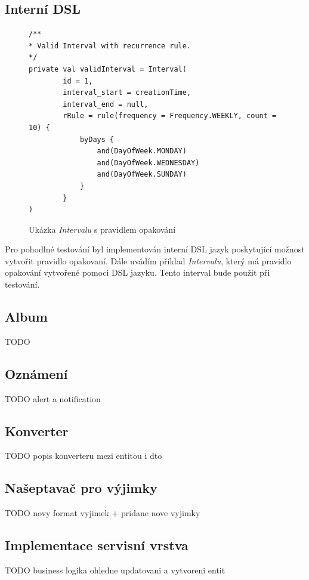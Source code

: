     \subsection{Interní DSL}
        \begin{figure} %
            \begin{verbatim}
/**
* Valid Interval with recurrence rule.
*/
private val validInterval = Interval(
        id = 1,
        interval_start = creationTime,
        interval_end = null,
        rRule = rule(frequency = Frequency.WEEKLY, count = 10) {
            byDays {
                and(DayOfWeek.MONDAY)
                and(DayOfWeek.WEDNESDAY)
                and(DayOfWeek.SUNDAY)
            }
        }
)
            \end{verbatim}
            \caption{Ukázka \textit{Intervalu} s pravidlem opakování} 
            \label{code:valid-interval}
        \end{figure}
        Pro pohodlné testování byl implementován interní DSL jazyk poskytující možnost vytvořit pravidlo opakovaní. Dále uvádím příklad \textit{Intervalu}, který má pravidlo opakování vytvořené pomoci DSL jazyku. Tento interval bude použit při testování.

    \subsection{Album}
        TODO
        
    \subsection{Oznámení}
        TODO alert a notification
        
    \subsection{Konverter}
        TODO popis konverteru mezi entitou i dto
        
    \subsection{Našeptavač pro výjimky}
        TODO novy format vyjimek + pridane nove vyjimky
        
    \subsection{Implementace servisní vrstva}%
        TODO business logika ohledne updatovani a vytvoreni entit
        
